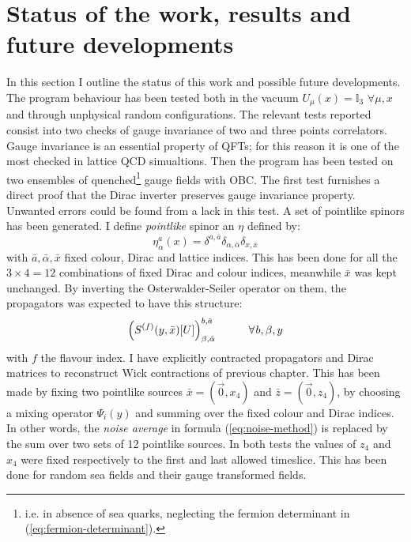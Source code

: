 \documentclass[english, LaM, oneside, noexaminfo]{sapthesis}
\begin{document}
\section{Status of the work, results and future developments}\label{sec:status}
\noindent
In this section I outline the status of this work and possible future developments.
The program behaviour has been tested both in the vacuum $U_\mu (x) = \mathbb{I}_3$ $\forall \mu,x$ and through unphysical random configurations.
The relevant tests reported consist into two checks of gauge invariance of two and three points correlators.
Gauge invariance is an essential property of QFTs; for this reason it is one of the most checked in lattice QCD simualtions.
Then the program has been tested on two ensembles of quenched\footnote{i.e. in absence of sea quarks, neglecting the fermion determinant in (\ref{eq:fermion-determinant}).} gauge fields with OBC.
\newline
The first test furnishes a direct proof that the Dirac inverter preserves gauge invariance property.
Unwanted errors could be found from a lack in this test.
A set of pointlike spinors has been generated.
I define {\it pointlike} spinor an $\eta$ defined by:
$$\eta_\alpha^a (x) = \delta^{a,\bar a}\delta_{\alpha, \bar \alpha} \delta_{x,\bar x}$$
with $\bar a, \bar \alpha, \bar x$ fixed colour, Dirac and lattice indices.
This has been done for all the $3\times 4 = 12$ combinations of fixed Dirac and colour indices, meanwhile $\bar x$ was kept unchanged.
By inverting the Osterwalder-Seiler operator on them, the propagators was expected to have this structure:
\begin{equation*}
    \left(S^{(f)}(y, \bar x)[U]\right)^{b,\bar a}_{\beta, \bar \alpha} \hspace*{1cm} \forall \hspace*{0.3mm} b,\beta,y
\end{equation*}
with $f$ the flavour index.
I have explicitly contracted propagators and Dirac matrices to reconstruct Wick contractions of previous chapter.
This has been made by fixing two pointlike sources $\bar x=(\vec 0, x_4)$ and  $\bar z=(\vec 0, z_4)$, by choosing a mixing operator $\Psi_i (y)$ and summing over the fixed colour and Dirac indices.
In other words, the {\it noise average} in formula (\ref{eq:noise-method}) is replaced by the sum over two sets of 12 pointlike sources.
In both tests the values of $z_4$ and $x_4$ were fixed respectively to the first and last allowed timeslice.
This has been done for random sea fields and their gauge transformed fields.
\end{document}
